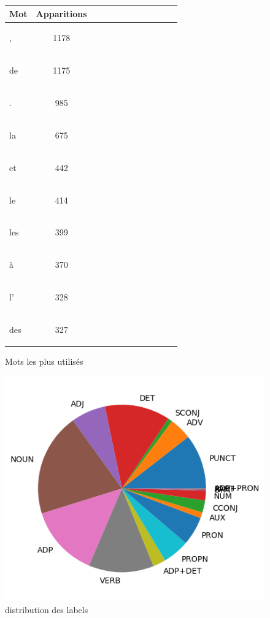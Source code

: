 \begin{figure}[H] \begin{minipage}{0.48\textwidth} \centering \begin{tabular}{|l || *{11 }{|c} |} \hline
Mot & Apparitions  \\ \hline
\begin{verb} , \end{verb} &1178\\ \hline
\begin{verb} de \end{verb} &1175\\ \hline
\begin{verb} . \end{verb} &985\\ \hline
\begin{verb} la \end{verb} &675\\ \hline
\begin{verb} et \end{verb} &442\\ \hline
\begin{verb} le \end{verb} &414\\ \hline
\begin{verb} les \end{verb} &399\\ \hline
\begin{verb} à \end{verb} &370\\ \hline
\begin{verb} l' \end{verb} &328\\ \hline
\begin{verb} des \end{verb} &327\\ \hline

\end{tabular}
\caption{ Mots les plus utilisés } \label{Fig:muw}\end{minipage} 
\begin{minipage}{0.48\textwidth} \centering
\label{Fig:pudtest_img.png}
\caption{distribution des labels}\includegraphics[width=.7\linewidth]{pudtest_img.png}

\end{minipage}
\end{figure}


